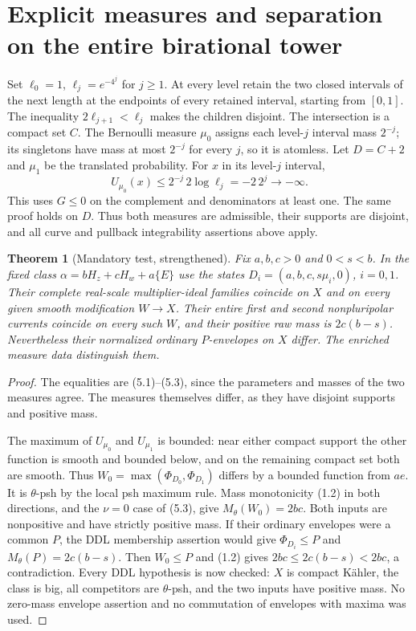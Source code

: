 \documentclass[11pt]{article}
\newtheorem{theorem}{Theorem}[section]
\theoremstyle{remark}\newtheorem{remark}[theorem]{Remark}
\begin{document}
\section{Explicit measures and separation on the entire birational tower}
Set $\ell_0=1$, $\ell_j=e^{-4^j}$ for $j\geq1$.
At every level retain the two closed intervals of the next length
at the endpoints of every retained interval, starting from $[0,1]$.
The inequality $2\ell_{j+1}<\ell_j$ makes the children disjoint.
The intersection is a compact set $C$.
The Bernoulli measure $\mu_0$ assigns each level-$j$ interval
mass $2^{-j}$; its singletons have mass at most $2^{-j}$ for
every $j$, so it is atomless. Let $D=C+2$ and $\mu_1$ be the
translated probability.
For $x$ in its level-$j$ interval,
\[
 U_{\mu_0}(x)\leq 2^{-j}\,2\log\ell_j=-2\,2^j\longrightarrow-\infty.
 \tag{6.1}
\]
This uses $G\leq0$ on the complement and denominators at least one.
The same proof holds on $D$. Thus both measures are admissible,
their supports are disjoint, and all curve and pullback
integrability assertions above apply.

\begin{theorem}[Mandatory test, strengthened]\label{mandatory}
Fix $a,b,c>0$ and $0<s<b$. In the fixed class
$\alpha=bH_z+cH_w+a\{E\}$ use the states
$D_i=(a,b,c,s\mu_i,0)$, $i=0,1$.
Their complete real-scale multiplier-ideal families coincide on
$X$ and on every given smooth modification $W\to X$.
Their entire first and second nonpluripolar currents coincide
on every such $W$, and their positive raw mass is
$2c(b-s)$.
Nevertheless their normalized ordinary $P$-envelopes on $X$ differ.
The enriched measure data distinguish them.
\end{theorem}
\begin{proof}
The equalities are (5.1)--(5.3), since the parameters and masses
of the two measures agree. The measures themselves differ,
as they have disjoint supports and positive mass.

The maximum of $U_{\mu_0}$ and $U_{\mu_1}$ is bounded:
near either compact support the other function is smooth and
bounded below, and on the remaining compact set both are smooth.
Thus
$W_0=\max(\Phi_{D_0},\Phi_{D_1})$
differs by a bounded function from $ae$.
It is $\theta$-psh by the local psh maximum rule.
Mass monotonicity (1.2) in both directions, and the $\nu=0$
case of (5.3), give $M_\theta(W_0)=2bc$.
Both inputs are nonpositive and have strictly positive mass.
If their ordinary envelopes were a common $P$, the DDL membership
assertion would give $\Phi_{D_i}\leq P$ and
$M_\theta(P)=2c(b-s)$.
Then $W_0\leq P$ and (1.2) gives
$2bc\leq2c(b-s)<2bc$, a contradiction.
Every DDL hypothesis is now checked: $X$ is compact K\"ahler,
the class is big, all competitors are $\theta$-psh,
and the two inputs have positive mass. No zero-mass envelope
assertion and no commutation of envelopes with maxima was used.
\end{proof}
\end{document}
